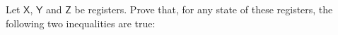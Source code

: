 \documentclass[boxes,pages,color=SeaGreen]{homework}
\renewcommand{\op}[1]{\operatorname{#1}}
\newcommand{\reg}[1]{\mathsf{#1}}
\begin{document}


\begin{problem}
Let $\reg{X}$, $\reg{Y}$ and $\reg{Z}$ be registers.
Prove that, for any state of these registers, the following two inequalities
are true:
\end{problem}
\end{document}
